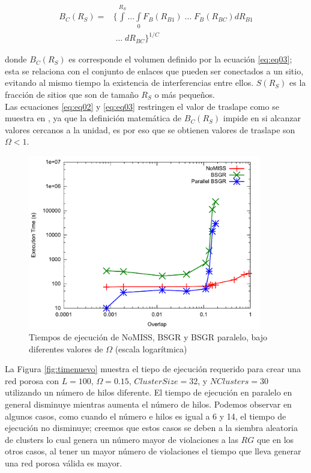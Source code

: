 \begin{eqnarray}
\nonumber \\
B_C(R_S) = & \{\int\limits^{R_S} ... \int\limits_{0} F_B(R_{B1})\; ... \; F_B(R_{BC})dR_{B1} \nonumber \\
& \; \ldots \; dR_{BC} \}^{1/C}
\label{eq:eq03}
\end{eqnarray}

donde $B_C(R_S)$ es corresponde el volumen definido por la ecuación \ref{eq:eq03}; esta se relaciona con el conjunto de enlaces que pueden ser conectados a un sitio, evitando al mismo tiempo la existencia de interferencias entre ellos. $S(R_S)$ es la fracción de sitios que son de tamaño $R_S$ o más pequeños.\\

Las ecuaciones \ref{eq:eq02} y \ref{eq:eq03} restringen el valor de traslape como se muestra en \cite{ref5}, ya que la definición matemática de $B_C(R_S)$ impide en si alcanzar valores cercanos a la unidad, es por eso que se obtienen valores de traslape son $\Omega<1$.\\

\begin{figure}[hbtp]
\centering
\includegraphics[width=4in]{img/variatraslape.pdf}
\caption{Tiempos de ejecución de NoMISS, BSGR y BSGR paralelo, bajo diferentes valores de $\Omega$ (escala logarítmica)}
\label{fig:timevartraslape}
\end{figure}

La Figura \ref{fig:timenuevo} muestra el tiepo de ejecución requerido para crear una red porosa con $L=100$, $\Omega=0.15$, $ClusterSize=32$, y $NClusters=30$ utilizando un número de hilos diferente. El tiempo de ejecución en paralelo en general disminuye mientras aumenta el número de hilos. Podemos observar en algunos casos, como cuando el número e hilos  es igual a 6 y 14, el tiempo de ejecución no disminuye; creemos que estos casos se deben a la siembra aleatoria de clusters lo cual genera un número mayor de violaciones a las $RG$ que en los otros casos, al tener un mayor número de violaciones el tiempo que lleva generar una red porosa válida es mayor.\\
 
